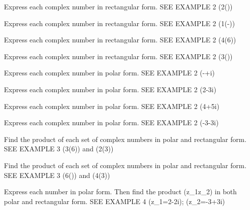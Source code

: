 \documentclass{article}
\newenvironment{practice}[2]{}{}        %
\newcommand{\answer}[1]{}               %
\begin{document}
\begin{practice}{25}{1}
Express each complex number in rectangular form. SEE EXAMPLE 2
(2(\frac{}))
\answer{(2i)}
\end{practice}
\begin{practice}{26}{1}
Express each complex number in rectangular form. SEE EXAMPLE 2
(1(-\frac{}))
\answer{(\frac12-\frac{\sqrt3}2i)}
\end{practice}
\begin{practice}{27}{1}
Express each complex number in rectangular form. SEE EXAMPLE 2
(4(\frac{11\pi}6))
\answer{(2\sqrt3-2i)}
\end{practice}
\begin{practice}{28}{1}
Express each complex number in rectangular form. SEE EXAMPLE 2
(3(\frac{}))
\answer{(\frac{3\sqrt2}2+\frac{3\sqrt2}2i)}
\end{practice}
\begin{practice}{29}{1}
Express each complex number in polar form. SEE EXAMPLE 2
(-+i)
\answer{(2\operatorname{cis}\frac{5\pi}6)}
\end{practice}
\begin{practice}{30}{1}
Express each complex number in polar form. SEE EXAMPLE 2
(2-3i)
\answer{(3.61\operatorname{cis}5.30)}
\end{practice}
\begin{practice}{31}{1}
Express each complex number in polar form. SEE EXAMPLE 2
(4+5i)
\answer{(6.4\operatorname{cis}0.9)}
\end{practice}
\begin{practice}{32}{1}
Express each complex number in polar form. SEE EXAMPLE 2
(-3-3i)
\answer{(4.24\operatorname{cis}\frac{5\pi}4)}
\end{practice}
\begin{practice}{33}{1}
Find the product of each set of complex numbers in polar and rectangular form. SEE EXAMPLE 3
(3(\frac{7\pi}6)) and (2(\frac{2\pi}3))
\answer{(6\operatorname{cis}\frac{11\pi}6); (3\sqrt3-3i)}
\end{practice}
\begin{practice}{34}{1}
Find the product of each set of complex numbers in polar and rectangular form. SEE EXAMPLE 3
(6(\frac{})) and (4(\frac{2\pi}3))
\answer{(24\operatorname{cis}\pi); -24}
\end{practice}
\begin{practice}{35}{1}
Express each number in polar form. Then find the product (z_1z_2) in both polar and rectangular form. SEE EXAMPLE 4
(z_1=2-2i); (z_2=-3+3i)
\answer{(z_1=2\sqrt2\operatorname{cis}\frac{7\pi}4); (z_2=3\sqrt2\operatorname{cis}\frac{3\pi}4); (z_1z_2=12\operatorname{cis}\frac{5\pi}2); (12i)}
\end{practice}
\end{document}
